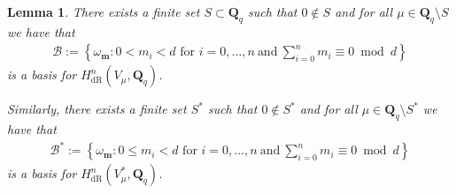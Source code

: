 \documentclass[11pt]{article}
\numberwithin{equation}{section}
\newtheorem{Lemma}[Theorem]{Lemma}
\DeclareMathOperator{\dR}{dR}
\begin{document}
\begin{Lemma}\label{lemBasis} There exists a finite set $S\subset \mathbf{Q}_q$ such that $0\not \in S$ and for all $\mu\in \mathbf{Q}_q\setminus S$ we have that
\begin{gather*}\mathcal{B}:=\left \{\omega_{\mathbf{m}} \colon 0<m_i<d \mbox{ for } i=0,\dots, n \ \text{and} \ \sum_{i=0}^n m_i\equiv 0 \bmod d\right \}\end{gather*}
is a basis for $H^n_{\dR}(V_\mu,\mathbf{Q}_q)$.

Similarly, there exists a finite set $S^*$ such that $0\not \in S^*$ and for all $\mu\in\mathbf{Q}_q\setminus S^*$ we have that
\begin{gather*}\mathcal{B}^*:=\left \{\omega_{\mathbf{m}} \colon 0\leq m_i<d \mbox{ for } i=0,\dots, n \ \text{and} \ \sum_{i=0}^n m_i\equiv 0 \bmod d\right\}\end{gather*}
is a basis for $H^n_{\dR}(V_\mu^*,\mathbf{Q}_q)$.
\end{Lemma}
\end{document}
